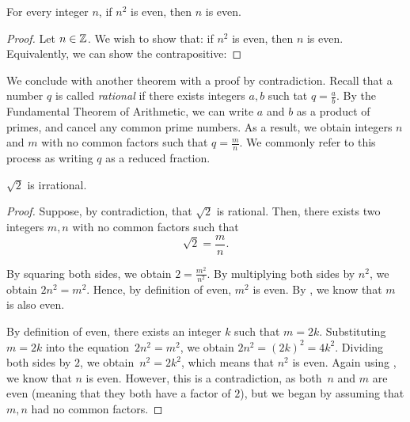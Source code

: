 \begin{theorem}\label{thm:evensquare}
    For every integer $n$, if $n^2$ is even, then $n$ is even.
\end{theorem}
\begin{proof}
    Let $n\in {\mathbb Z}$.  We wish to show that: if $n^2$ is even, then $n$ is even.
    Equivalently, we can show the contrapositive:

    \proofspace
\end{proof}

We conclude with another theorem with a proof by contradiction.  Recall that a
number $q$ is called \emph{rational} if there exists integers $a,b$ such tat
$q=\frac{a}{b}$.  By the Fundamental Theorem of Arithmetic, we can write $a$ and
$b$ as a product of primes, and cancel any common prime numbers.  As a result,
we obtain integers $n$ and $m$ with no common factors such that $q=\frac{m}{n}$.
We commonly refer to this process as writing $q$ as a
reduced fraction.

\begin{theorem}
    $\sqrt{2}$ is irrational.
\end{theorem}

\begin{proof}
    Suppose, by contradiction, that $\sqrt{2}$ is rational.  Then, there exists
    two integers $m,n$ with no common factors such that
    $$ \sqrt{2}=\frac{m}{n}.$$

    By squaring both sides, we obtain $2=\frac{m^2}{n^2}$.
    By multiplying both sides by $n^2$, we obtain $2n^2=m^2$.
    Hence, by definition of even, $m^2$ is even.
    By , we know that $m$ is also even.

    By definition of even, there exists an integer $k$ such that $m=2k$.
    Substituting $m=2k$ into the equation~$2n^2=m^2$, we obtain
    $2n^2=(2k)^2=4k^2$. Dividing both sides by $2$, we obtain~$n^2=2k^2$, which
    means that $n^2$ is even.  Again using , we know that $n$
    is even.  However, this is a contradiction, as both~$n$ and $m$ are even
    (meaning that they both have a factor of $2$),
    but we began by assuming that $m,n$ had no common factors.
\end{proof}
